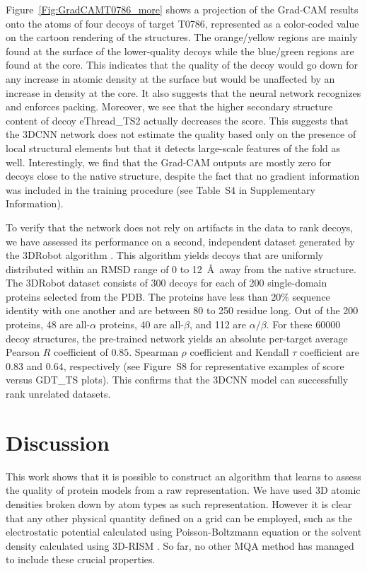 \documentclass{bioinfo}
\begin{document}
Figure~\ref{Fig:GradCAMT0786_more} shows a projection of the Grad-CAM
results onto the atoms of four decoys of target T0786, represented as
a color-coded value on the cartoon rendering of the structures. The
orange/yellow regions are mainly found at the surface of the
lower-quality decoys while the blue/green regions are found at the
core. This indicates that the quality of the decoy would go down for
any increase in atomic density at the surface but would be unaffected
by an increase in density at the core. It also suggests that the
neural network recognizes and enforces packing.
%
Moreover, we see that the higher secondary structure content of decoy
eThread\_TS2 actually decreases the score.  This suggests that the
3DCNN network does not estimate the quality based only on the presence
of local structural elements but that it detects large-scale features
of the fold as well.
%
Interestingly, we find that the Grad-CAM outputs are mostly zero for
decoys close to the native structure, despite the fact that no
gradient information was included in the training procedure (see
Table~S4 in Supplementary Information).

To verify that the network does not rely on artifacts in the data to
rank decoys, we have assessed its performance on a second, independent
dataset generated by the 3DRobot algorithm \citep{deng20163drobot}.
This algorithm yields decoys that are uniformly distributed within an
RMSD range of 0 to 12~\AA\ away from the native structure.
%
The 3DRobot dataset consists of 300 decoys for each of 200
single-domain proteins selected from the PDB. The proteins have less
than 20\% sequence identity with one another and are between 80 to 250
residue long. Out of the 200 proteins, 48 are all-$\alpha$ proteins,
40 are all-$\beta$, and 112 are $\alpha/\beta$.
%
For these 60000 decoy structures, the pre-trained network yields an
absolute per-target average Pearson $R$ coefficient of $0.85$.
Spearman $\rho$ coefficient and Kendall $\tau$ coefficient are $0.83$
and $0.64$, respectively (see Figure~S8 for representative examples of
score versus GDT\_TS plots). This confirms that the 3DCNN model
can successfully rank unrelated datasets.


\section{Discussion}

This work shows that it is possible to construct an algorithm that
learns to assess the quality of protein models from a raw
representation. We have used 3D atomic densities broken down by atom
types as such representation. However it is clear that any other
physical quantity defined on a grid can be employed, such as the
electrostatic potential calculated using Poisson-Boltzmann equation
\citep{honig95} or the solvent density calculated using 3D-RISM
\citep{stumpe2011}. So far, no other MQA method has managed
to include these crucial properties.
\end{document}
